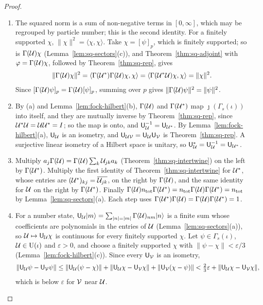 \begin{vetdenv}
\begin{proof}
\begin{enumerate}
\item[(a)] The squared norm is a sum of non-negative terms in $[0,\infty]$, which may be regrouped by particle
number; this is the second identity. For a finitely supported $\chi$, $\lVert\chi\rVert^2=\langle\chi,\chi\rangle$. Take
$\chi=[\psi]_p$, which is finitely supported; so is $\Gamma(\mathcal U)\chi$ (Lemma~\ref{lem:sq-sectors}(c)), and
Theorem~\ref{thm:sq-adjoint} with $\varphi=\Gamma(\mathcal U)\chi$, followed by Theorem~\ref{thm:sq-rep}, gives
\[
 \lVert\Gamma(\mathcal U)\chi\rVert^2=\langle\Gamma(\mathcal U^*)\Gamma(\mathcal U)\chi,\chi\rangle=\langle\Gamma(\mathcal U^*\mathcal U)\chi,\chi\rangle
 =\lVert\chi\rVert^2 .
\]
Since $[\Gamma(\mathcal U)\psi]_p=\Gamma(\mathcal U)[\psi]_p$, summing over $p$ gives $\lVert\Gamma(\mathcal U)\psi\rVert^2=\lVert\psi\rVert^2$.
\item[(b)] By (a) and Lemma~\ref{lem:fock-hilbert}(b), $\Gamma(\mathcal U)$ and $\Gamma(\mathcal U^*)$ map $\jmath(\Gamma_s(\iota))$
into itself, and they are mutually inverse by Theorem~\ref{thm:sq-rep}, since $\mathcal U^*\mathcal U=\mathcal U\mathcal U^*=I$; so the map is
onto, and $\mathsf U_\mathcal U^{-1}=\mathsf U_{\mathcal U^*}$. By Lemma~\ref{lem:fock-hilbert}(a), $\mathsf U_\mathcal U$ is an isometry, and
$\mathsf U_{\mathcal U\mathcal V}=\mathsf U_\mathcal U\mathsf U_\mathcal V$ is Theorem~\ref{thm:sq-rep}. A surjective linear isometry of a Hilbert space is unitary,
so $\mathsf U_\mathcal U^*=\mathsf U_\mathcal U^{-1}=\mathsf U_{\mathcal U^*}$.
\item[(c)] Multiply $a_j\Gamma(\mathcal U)=\Gamma(\mathcal U)\sum_k\mathcal U_{jk}a_k$ (Theorem~\ref{thm:sq-intertwine}) on the left by
$\Gamma(\mathcal U^*)$. Multiply the first identity of Theorem~\ref{thm:sq-intertwine} for $\mathcal U^*$, whose entries are
$(\mathcal U^*)_{kj}=\overline{\mathcal U_{jk}}$, on the right by $\Gamma(\mathcal U)$, and the same identity for $\mathcal U$ on the right by
$\Gamma(\mathcal U^*)$. Finally $\Gamma(\mathcal U)n_{\mathrm{tot}}\Gamma(\mathcal U^*)=n_{\mathrm{tot}}\Gamma(\mathcal U)\Gamma(\mathcal U^*)=n_{\mathrm{tot}}$ by
Lemma~\ref{lem:sq-sectors}(a). Each step uses $\Gamma(\mathcal U^*)\Gamma(\mathcal U)=\Gamma(\mathcal U)\Gamma(\mathcal U^*)=1$.
\item[(d)] For a number state, $\mathsf U_\mathcal U\lvert m\rangle=\sum_{\lvert n\rvert=\lvert m\rvert}\Gamma(\mathcal U)_{nm}\lvert n\rangle$ is a finite sum
whose coefficients are polynomials in the entries of $\mathcal U$ (Lemma~\ref{lem:sq-sectors}(a)), so $\mathcal U\mapsto\mathsf U_\mathcal U\chi$
is continuous for every finitely supported $\chi$. Let $\psi\in\Gamma_s(\iota)$, $\mathcal U\in\mathrm U(\iota)$ and
$\varepsilon>0$, and choose a finitely supported $\chi$ with $\lVert\psi-\chi\rVert<\varepsilon/3$
(Lemma~\ref{lem:fock-hilbert}(c)). Since every $\mathsf U_\mathcal V$ is an isometry,
\[
 \lVert\mathsf U_\mathcal U\psi-\mathsf U_\mathcal V\psi\rVert\le\lVert\mathsf U_\mathcal U(\psi-\chi)\rVert+\lVert\mathsf U_\mathcal U\chi-\mathsf U_\mathcal V\chi\rVert
 +\lVert\mathsf U_\mathcal V(\chi-\psi)\rVert<\tfrac23\varepsilon+\lVert\mathsf U_\mathcal U\chi-\mathsf U_\mathcal V\chi\rVert,
\]
which is below $\varepsilon$ for $\mathcal V$ near $\mathcal U$.\qedhere
\end{enumerate}
\end{proof}


\end{vetdenv}

